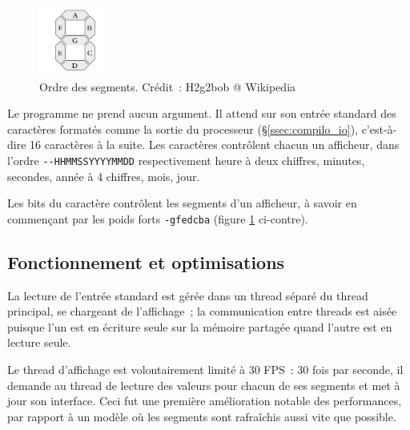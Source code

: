 \documentclass[11pt,a4paper]{article}
\begin{document}
\begin{figure}
\begin{center}
\vspace{-1em}
\includegraphics[width=0.2\textwidth]{imgs/7seg-labels.png}
\end{center}
\vspace{-2em}
\caption{Ordre des segments. Crédit~: H2g2bob @ Wikipedia}
\label{fig:segorder}
\vspace{-2em}
\end{figure}

Le programme ne prend aucun argument. Il attend sur son entrée standard des caractères formatés comme la sortie du processeur (§\ref{ssec:compilo_io}), c'est-à-dire 16 caractères à la suite. Les caractères contrôlent chacun un afficheur, dans l'ordre \verb!--HHMMSSYYYYMMDD! respectivement heure à deux chiffres, minutes, secondes, année à 4 chiffres, mois, jour.

Les bits du caractère contrôlent les segments d'un afficheur, à savoir en commençant par les poids forts \verb!-gfedcba! (figure \ref{fig:segorder} ci-contre).

\subsection{Fonctionnement et optimisations}

La lecture de l'entrée standard est gérée dans un thread séparé du thread principal, se chargeant de l'affichage~; la communication entre threads est aisée puisque l'un est en écriture seule sur la mémoire partagée quand l'autre est en lecture seule.

Le thread d'affichage est volontairement limité à 30 FPS~: 30 fois par seconde, il demande au thread de lecture des valeurs pour chacun de ses segments et met à jour son interface. Ceci fut une première amélioration notable des performances, par rapport à un modèle où les segments sont rafraîchis aussi vite que possible.
\end{document}
